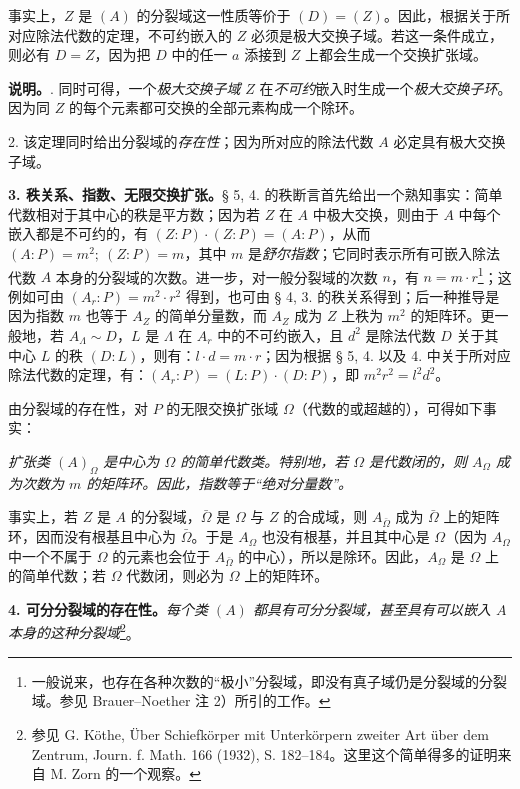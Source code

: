 \documentclass[11pt]{article}
\providecommand{\srcspaced}[1]{#1}
\begin{document}
事实上，\(Z\) 是 \((A)\) 的分裂域这一性质等价于 \((D)=(Z)\)。因此，根据关于所对应除法代数的定理，不可约嵌入的 \(Z\) 必须是极大交换子域。若这一条件成立，则必有 \(D=Z\)，因为把 \(D\) 中的任一 \(a\) 添接到 \(Z\) 上都会生成一个交换扩张域。

\noindent\textbf{\srcspaced{说明。}}. 同时可得，一个\emph{极大交换子域} \(Z\) 在\emph{不可约}嵌入时生成一个\emph{极大交换子环}。因为同 \(Z\) 的每个元素都可交换的全部元素构成一个除环。

2. 该定理同时给出分裂域的\emph{存在性}；因为所对应的除法代数 \(A\) 必定具有极大交换子域。

\medskip
\noindent\textbf{\srcspaced{3. 秩关系、指数、无限交换扩张。}}\quad § 5, 4. 的秩断言首先给出一个熟知事实：简单代数相对于其中心的秩是平方数；因为若 \(Z\) 在 \(A\) 中极大交换，则由于 \(A\) 中每个嵌入都是不可约的，有 \((Z:P)\cdot(Z:P)=(A:P)\)，从而 \((A:P)=m^2;\ (Z:P)=m\)，其中 \(m\) 是\emph{舒尔指数}；它同时表示所有可嵌入除法代数 \(A\) 本身的分裂域的次数。进一步，对一般分裂域的次数 \(n\)，有 \(n=m\cdot r\)\footnote{一般说来，也存在各种次数的“极小”分裂域，即没有真子域仍是分裂域的分裂域。参见 Brauer--Noether 注 2）所引的工作。}；这例如可由 \((A_r:P)=m^2\cdot r^2\) 得到，也可由 § 4, 3. 的秩关系得到；后一种推导是因为指数 \(m\) 也等于 \(A_Z\) 的简单分量数，而 \(A_Z\) 成为 \(Z\) 上秩为 \(m^2\) 的矩阵环。更一般地，若 \(A_\Lambda\sim D\)，\(L\) 是 \(\Lambda\) 在 \(A_r\) 中的不可约嵌入，且 \(d^2\) 是除法代数 \(D\) 关于其中心 \(L\) 的秩 \((D:L)\)，则有：\(l\cdot d=m\cdot r\)；因为根据 § 5, 4. 以及 4. 中关于所对应除法代数的定理，有：\((A_r:P)=(L:P)\cdot(D:P)\)，即 \(m^2r^2=l^2d^2\)。

由分裂域的存在性，对 \(P\) 的无限交换扩张域 \(\Omega\)（代数的或超越的），可得如下事实：

\noindent\emph{扩张类 \((A)_\Omega\) 是中心为 \(\Omega\) 的简单代数类。特别地，若 \(\Omega\) 是代数闭的，则 \(A_\Omega\) 成为次数为 \(m\) 的矩阵环。因此，指数等于“绝对分量数”。}

事实上，若 \(Z\) 是 \(A\) 的分裂域，\(\bar\Omega\) 是 \(\Omega\) 与 \(Z\) 的合成域，则 \(A_{\bar\Omega}\) 成为 \(\bar\Omega\) 上的矩阵环，因而没有根基且中心为 \(\bar\Omega\)。于是 \(A_\Omega\) 也没有根基，并且其中心是 \(\Omega\)（因为 \(A_\Omega\) 中一个不属于 \(\Omega\) 的元素也会位于 \(A_{\bar\Omega}\) 的中心），所以是除环。因此，\(A_\Omega\) 是 \(\Omega\) 上的简单代数；若 \(\Omega\) 代数闭，则必为 \(\Omega\) 上的矩阵环。

\medskip
\noindent\textbf{\srcspaced{4. 可分分裂域的存在性。}}\quad \emph{每个类 \((A)\) 都具有可分分裂域，甚至具有可以嵌入 \(A\) 本身的这种分裂域}\footnote{参见 G. Köthe, Über Schiefkörper mit Unterkörpern zweiter Art über dem Zentrum, Journ. f. Math. 166 (1932), S. 182--184。这里这个简单得多的证明来自 M. Zorn 的一个观察。}。
\end{document}
